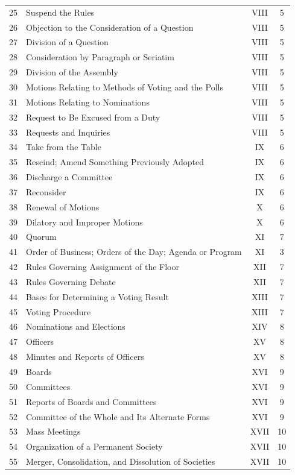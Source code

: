 \documentclass[11pt]{article}
\begin{document}
\begin{longtable}{@{}r p{.64\linewidth} c c@{}}
25 & Suspend the Rules & VIII & 5\\
26 & Objection to the Consideration of a Question & VIII & 5\\
27 & Division of a Question & VIII & 5\\
28 & Consideration by Paragraph or Seriatim & VIII & 5\\
29 & Division of the Assembly & VIII & 5\\
30 & Motions Relating to Methods of Voting and the Polls & VIII & 5\\
31 & Motions Relating to Nominations & VIII & 5\\
32 & Request to Be Excused from a Duty & VIII & 5\\
33 & Requests and Inquiries & VIII & 5\\
34 & Take from the Table & IX & 6\\
35 & Rescind; Amend Something Previously Adopted & IX & 6\\
36 & Discharge a Committee & IX & 6\\
37 & Reconsider & IX & 6\\
38 & Renewal of Motions & X & 6\\
39 & Dilatory and Improper Motions & X & 6\\
40 & Quorum & XI & 7\\
41 & Order of Business; Orders of the Day; Agenda or Program & XI & 3\\
42 & Rules Governing Assignment of the Floor & XII & 7\\
43 & Rules Governing Debate & XII & 7\\
44 & Bases for Determining a Voting Result & XIII & 7\\
45 & Voting Procedure & XIII & 7\\
46 & Nominations and Elections & XIV & 8\\
47 & Officers & XV & 8\\
48 & Minutes and Reports of Officers & XV & 8\\
49 & Boards & XVI & 9\\
50 & Committees & XVI & 9\\
51 & Reports of Boards and Committees & XVI & 9\\
52 & Committee of the Whole and Its Alternate Forms & XVI & 9\\
53 & Mass Meetings & XVII & 10\\
54 & Organization of a Permanent Society & XVII & 10\\
55 & Merger, Consolidation, and Dissolution of Societies & XVII & 10\\

\end{longtable}
\end{document}
